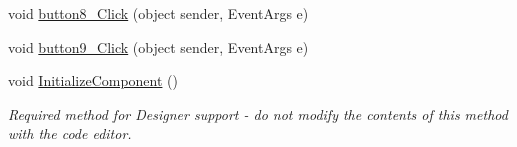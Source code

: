 \begin{DoxyCompactItemize}
\item 
void \hyperlink{class__7___doroshenko__forms2__is52_1_1_form1_a35447b2c82b039f1052e0db60b265d29}{button8\+\_\+\+Click} (object sender, Event\+Args e)
\item 
void \hyperlink{class__7___doroshenko__forms2__is52_1_1_form1_a9e133a8f77372997020c9fc2353f240e}{button9\+\_\+\+Click} (object sender, Event\+Args e)
\item 
void \hyperlink{class__7___doroshenko__forms2__is52_1_1_form1_a5f037fdde44f5c3dff59d46faa2cb99f}{Initialize\+Component} ()
\begin{DoxyCompactList}\small\item\em Required method for Designer support -\/ do not modify the contents of this method with the code editor. \end{DoxyCompactList}\end{DoxyCompactItemize}
